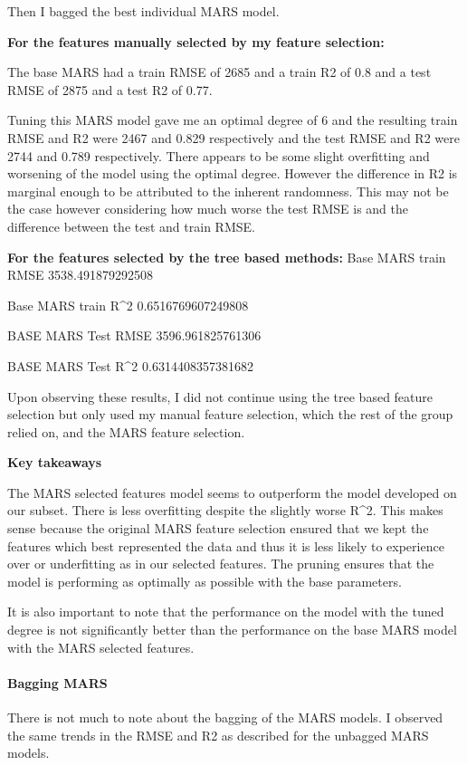 \documentclass[
  letterpaper,
  DIV=11,
  numbers=noendperiod]{scrartcl}
\let\oldparagraph\paragraph
\renewcommand{\paragraph}[1]{\oldparagraph{#1}\mbox{}}
\begin{document}
Then I bagged the best individual MARS model.

\textbf{For the features manually selected by my feature selection:}

The base MARS had a train RMSE of 2685 and a train R2 of 0.8 and a test
RMSE of 2875 and a test R2 of 0.77.

Tuning this MARS model gave me an optimal degree of 6 and the resulting
train RMSE and R2 were 2467 and 0.829 respectively and the test RMSE and
R2 were 2744 and 0.789 respectively. There appears to be some slight
overfitting and worsening of the model using the optimal degree. However
the difference in R2 is marginal enough to be attributed to the inherent
randomness. This may not be the case however considering how much worse
the test RMSE is and the difference between the test and train RMSE.

\textbf{For the features selected by the tree based methods:} Base MARS
train RMSE 3538.491879292508

Base MARS train R\^{}2 0.6516769607249808

BASE MARS Test RMSE 3596.961825761306

BASE MARS Test R\^{}2 0.6314408357381682

Upon observing these results, I did not continue using the tree based
feature selection but only used my manual feature selection, which the
rest of the group relied on, and the MARS feature selection.

\textbf{Key takeaways}

The MARS selected features model seems to outperform the model developed
on our subset. There is less overfitting despite the slightly worse
R\^{}2. This makes sense because the original MARS feature selection
ensured that we kept the features which best represented the data and
thus it is less likely to experience over or underfitting as in our
selected features. The pruning ensures that the model is performing as
optimally as possible with the base parameters.

It is also important to note that the performance on the model with the
tuned degree is not significantly better than the performance on the
base MARS model with the MARS selected features.

\hypertarget{bagging-mars}{%
\paragraph{Bagging MARS}\label{bagging-mars}}

There is not much to note about the bagging of the MARS models. I
observed the same trends in the RMSE and R2 as described for the
unbagged MARS models.
\end{document}
